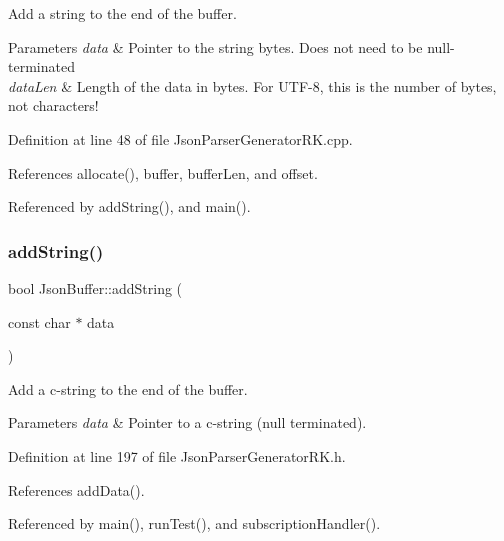 Add a string to the end of the buffer. 


\begin{DoxyParams}{Parameters}
{\em data} & Pointer to the string bytes. Does not need to be null-\/terminated\\
\hline
{\em data\+Len} & Length of the data in bytes. For U\+T\+F-\/8, this is the number of bytes, not characters! \\
\hline
\end{DoxyParams}


Definition at line 48 of file Json\+Parser\+Generator\+R\+K.\+cpp.



References allocate(), buffer, buffer\+Len, and offset.



Referenced by add\+String(), and main().

\mbox{\label{class_json_buffer_a61bf30ac6e1bd460f1e809d02a7d5ba4}} 
\subsubsection{\texorpdfstring{add\+String()}{addString()}}
{\footnotesize\ttfamily bool Json\+Buffer\+::add\+String (\begin{DoxyParamCaption}\item[{const char $\ast$}]{data }\end{DoxyParamCaption})\hspace{0.3cm}{\ttfamily [inline]}}



Add a c-\/string to the end of the buffer. 


\begin{DoxyParams}{Parameters}
{\em data} & Pointer to a c-\/string (null terminated). \\
\hline
\end{DoxyParams}


Definition at line 197 of file Json\+Parser\+Generator\+R\+K.\+h.



References add\+Data().



Referenced by main(), run\+Test(), and subscription\+Handler().

\mbox{\label{class_json_buffer_a1eb9d0cae3ef9a9ac56b8580bc70fe2e}} 
